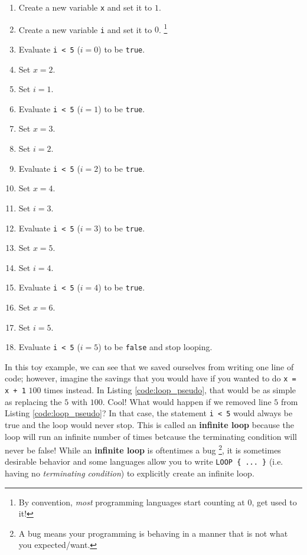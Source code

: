 \documentclass{article}
\begin{document}
\begin{enumerate}
\item Create a new variable \lstinline{x} and set it to $1$.
\item Create a new variable \lstinline{i} and set it to $0$. \footnote{By convention, \textit{most} programming languages start counting at $0$, get used to it!}
\item Evaluate \lstinline{i < 5} ($i = 0$) to be \lstinline{true}.
\item Set $x = 2$.
\item Set $i = 1$.
\item Evaluate \lstinline{i < 5} ($i = 1$) to be \lstinline{true}.
\item Set $x = 3$.
\item Set $i = 2$.
\item Evaluate \lstinline{i < 5} ($i = 2$) to be \lstinline{true}.
\item Set $x = 4$.
\item Set $i = 3$.
\item Evaluate \lstinline{i < 5} ($i = 3$) to be \lstinline{true}.
\item Set $x = 5$.
\item Set $i = 4$.
\item Evaluate \lstinline{i < 5} ($i = 4$) to be \lstinline{true}.
\item Set $x = 6$.
\item Set $i = 5$.
\item Evaluate \lstinline{i < 5} ($i = 5$) to be \lstinline{false} and stop looping.
\end{enumerate}
In this toy example, we can see that we saved ourselves from writing one line of code; however, imagine the savings that you would have if you wanted to do \lstinline{x = x + 1} $100$ times instead.
In Listing \ref{code:loop_pseudo}, that would be as simple as replacing the $5$ with $100$.
Cool!
What would happen if we removed line $5$ from Listing \ref{code:loop_pseudo}?
In that case, the statement \lstinline{i < 5} would always be true and the loop would never stop.
This is called an \textbf{infinite loop} because the loop will run an infinite number of times betcause the terminating condition will never be false!
While an \textbf{infinite loop} is oftentimes a bug \footnote{A bug means your programming is behaving in a manner that is not what you expected/want.}, it is sometimes desirable behavior and some languages allow you to write \lstinline|LOOP { ... }| (i.e. having no \textit{terminating condition}) to explicitly create an infinite loop.
\end{document}
